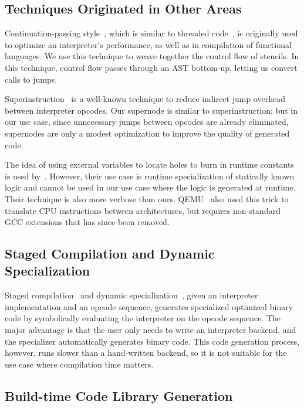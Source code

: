 \documentclass[acmsmall,nonacm,screen]{acmart}\settopmatter{printfolios=true,printccs=true,printacmref=false}
\begin{document}
\subsection*{Techniques Originated in Other Areas}

Continuation-passing style~\cite{steele1977}, which is similar to threaded code~\cite{bell1973}, is originally used to optimize an interpreter's performance, as well as in compilation of functional languages. We use this technique to weave together the control flow of stencils. In this technique, control flow passes through an AST bottom-up, letting us convert calls to jumps. 

Superinstruction~\cite{proebsting1995, javaSuperInstruction} is a well-known technique to reduce indirect jump overhead between interpreter opcodes. Our supernode is similar to superinstruction; but in our use case, since unnecessary jumps between opcodes are already eliminated, supernodes are only a modest optimization to improve the quality of generated code.

The idea of using external variables to locate holes to burn in runtime constants is used by~\citet{noel1998}. However, their use case is runtime specialization of statically known logic and cannot be used in our use case where the logic is generated at runtime. Their technique is also more verbose than ours. QEMU~\cite{qemuPaper} also used this trick to translate CPU instructions between architectures, but requires non-standard GCC extensions that has since been removed.


\subsection*{Staged Compilation and Dynamic Specialization}

Staged compilation~\cite{thibault2000,consel1998} and dynamic specialization~\cite{finkel2019}, given an interpreter implementation and an opcode sequence, generates specialized optimized binary code by symbolically evaluating the interpreter on the opcode sequence. The major advantage is that the user only needs to write an interpreter backend, and the specializer automatically generates binary code. This code generation process, however, runs slower than a hand-written backend, so it is not suitable for the use case where compilation time matters.


\subsection*{Build-time Code Library Generation}
\end{document}
